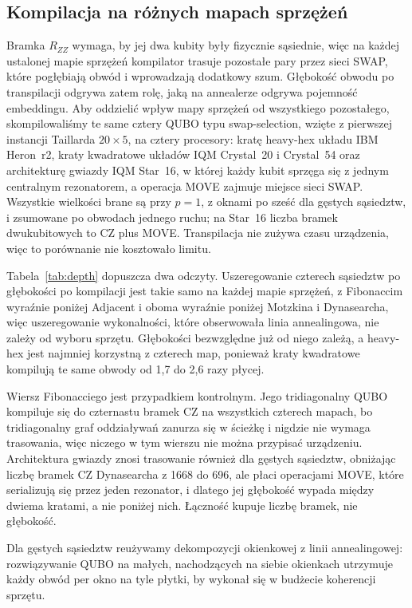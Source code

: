 \documentclass[11pt,a4paper]{article}
\begin{document}
\subsection{Kompilacja na różnych mapach sprzężeń}
\label{subsec:depth}
Bramka $R_{ZZ}$ wymaga, by jej dwa kubity były fizycznie sąsiednie, więc na
każdej ustalonej mapie sprzężeń kompilator trasuje pozostałe pary przez sieci
SWAP, które pogłębiają obwód i wprowadzają dodatkowy szum. Głębokość obwodu po
transpilacji odgrywa zatem rolę, jaką na annealerze odgrywa pojemność
embeddingu. Aby oddzielić wpływ mapy sprzężeń od wszystkiego pozostałego,
skompilowaliśmy te same cztery QUBO typu swap-selection, wzięte z pierwszej
instancji Taillarda $20\times5$, na cztery procesory: kratę heavy-hex układu
IBM Heron~r2, kraty kwadratowe układów IQM Crystal~20 i Crystal~54 oraz
architekturę gwiazdy IQM Star~16, w której każdy kubit sprzęga się z jednym
centralnym rezonatorem, a operacja MOVE zajmuje miejsce sieci SWAP. Wszystkie
wielkości brane są przy $p=1$, z oknami po sześć dla gęstych sąsiedztw,
i zsumowane po obwodach jednego ruchu; na Star~16 liczba bramek dwukubitowych
to CZ plus MOVE. Transpilacja nie zużywa czasu urządzenia, więc to porównanie nie
kosztowało limitu.

Tabela~\ref{tab:depth} dopuszcza dwa odczyty. Uszeregowanie czterech
sąsiedztw po głębokości po kompilacji jest takie samo na każdej mapie
sprzężeń, z Fibonaccim wyraźnie poniżej Adjacent i oboma wyraźnie poniżej
Motzkina i Dynasearcha, więc uszeregowanie wykonalności, które obserwowała
linia annealingowa, nie zależy od wyboru sprzętu. Głębokości bezwzględne już
od niego zależą, a heavy-hex jest najmniej korzystną z czterech map, ponieważ
kraty kwadratowe kompilują te same obwody od 1,7 do 2,6 razy płycej.

Wiersz Fibonacciego jest przypadkiem kontrolnym. Jego tridiagonalny QUBO
kompiluje się do czternastu bramek CZ na wszystkich czterech mapach, bo
tridiagonalny graf oddziaływań zanurza się w ścieżkę i nigdzie nie wymaga
trasowania, więc niczego w tym wierszu nie można przypisać urządzeniu.
Architektura gwiazdy znosi trasowanie również dla gęstych sąsiedztw,
obniżając liczbę bramek CZ Dynasearcha z 1668 do 696, ale płaci operacjami
MOVE, które serializują się przez jeden rezonator, i dlatego jej głębokość
wypada między dwiema kratami, a nie poniżej nich. Łączność kupuje liczbę
bramek, nie głębokość.

Dla gęstych sąsiedztw reużywamy dekompozycji okienkowej z linii
annealingowej: rozwiązywanie QUBO na małych, nachodzących na siebie okienkach
utrzymuje każdy obwód per okno na tyle płytki, by wykonał się w budżecie
koherencji sprzętu.
\end{document}
